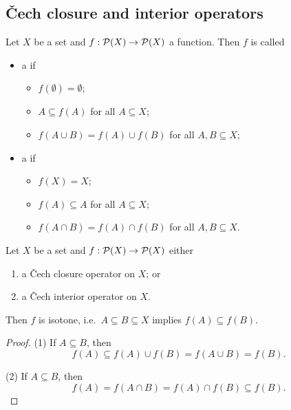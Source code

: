 \subsection{Čech closure and interior operators}
\begin{definition}
Let $X$ be a set and $f: \operatorname{\mathcal{P}}(X)\to \operatorname{\mathcal{P}}(X)$ a function. Then $f$ is called
\begin{itemize}
\item a  if
\begin{itemize}
\item $f(\emptyset) = \emptyset$;
\item $A\subseteq f(A)$ for all $A\subseteq X$;
\item $f(A \cup B) = f(A)\cup f(B)$ for all $A,B\subseteq X$;
\end{itemize}
\item a  if
\begin{itemize}
\item $f(X) = X$;
\item $f(A)\subseteq A$ for all $A\subseteq X$;
\item $f(A \cap B) = f(A)\cap f(B)$ for all $A,B\subseteq X$.
\end{itemize}
\end{itemize}
\end{definition}

\begin{lemma}
Let $X$ be a set and $f: \operatorname{\mathcal{P}}(X)\to \operatorname{\mathcal{P}}(X)$ either
\begin{enumerate}
\item a Čech closure operator on $X$; or
\item a Čech interior operator on $X$.
\end{enumerate}
Then $f$ is isotone, i.e.\ $A\subseteq B\subseteq X$ implies $f(A) \subseteq f(B)$.
\end{lemma}
\begin{proof}
(1) If $A\subseteq B$, then 
\[ f(A) \subseteq f(A)\cup f(B) = f(A\cup B) = f(B). \]

(2) If $A\subseteq B$, then 
\[ f(A) = f(A\cap B) = f(A)\cap f(B) \subseteq f(B). \]
\end{proof}

